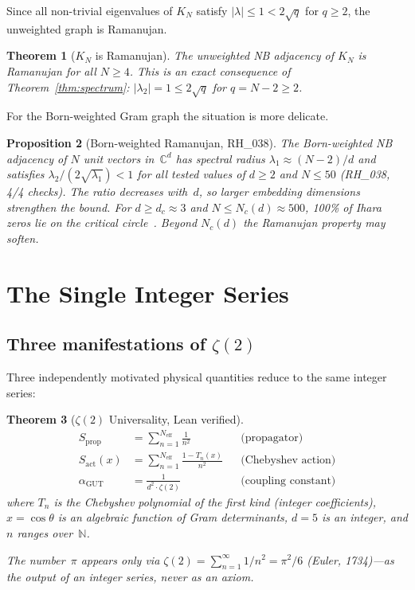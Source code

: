 \documentclass[12pt]{article}
\newtheorem{theorem}{Theorem}[section]
\newtheorem{proposition}[theorem]{Proposition}
\theoremstyle{definition}
\theoremstyle{remark}
\newcommand{\CC}{\mathbb{C}}
\newcommand{\NN}{\mathbb{N}}
\newcommand{\agut}{\alpha_{\mathrm{GUT}}}
\begin{document}
Since all non-trivial eigenvalues of $K_N$ satisfy
$|\lambda| \leq 1 < 2\sqrt{q}$ for $q \geq 2$,
the unweighted graph is Ramanujan.

\begin{theorem}[$K_N$ is Ramanujan]\label{thm:ram-kn}
The unweighted NB adjacency of $K_N$ is Ramanujan
for all $N \geq 4$.
This is an exact consequence of Theorem~\ref{thm:spectrum}:
$|\lambda_2| = 1 \leq 2\sqrt{q}$ for $q = N - 2 \geq 2$.
\end{theorem}

For the Born-weighted Gram graph the situation is more delicate.

\begin{proposition}[Born-weighted Ramanujan, RH\_038]\label{thm:ram-born}
The Born-weighted NB adjacency of $N$ unit vectors in~$\CC^d$
has spectral radius $\lambda_1 \approx (N-2)/d$ and satisfies
$\lambda_2 / (2\sqrt{\lambda_1}) < 1$ for all tested values
of $d \geq 2$ and $N \leq 50$ (RH\_038, 4/4 checks).
The ratio \emph{decreases} with~$d$, so larger embedding
dimensions strengthen the bound.
For $d \geq d_c \approx 3$ and $N \leq N_c(d) \approx 500$,
100\% of Ihara zeros lie on the critical circle~\cite{Paper5}.
Beyond $N_c(d)$ the Ramanujan property may soften.
\end{proposition}

\section{The Single Integer Series}
\label{sec:zeta2}

\subsection{Three manifestations of $\zeta(2)$}

Three independently motivated physical quantities reduce to the
same integer series:

\begin{theorem}[$\zeta(2)$ Universality, Lean verified]\label{thm:zeta2}
\begin{align}
  S_{\mathrm{prop}} &= \sum_{n=1}^{N_{\mathrm{eff}}} \frac{1}{n^2}
    &&\text{(propagator)} \label{eq:prop} \\
  S_{\mathrm{act}}(x) &= \sum_{n=1}^{N_{\mathrm{eff}}}
    \frac{1 - T_n(x)}{n^2}
    &&\text{(Chebyshev action)} \label{eq:act} \\
  \agut &= \frac{1}{d^2 \cdot \zeta(2)}
    &&\text{(coupling constant)} \label{eq:coupling}
\end{align}
where $T_n$ is the Chebyshev polynomial of the first kind
(integer coefficients), $x = \cos\theta$ is an algebraic
function of Gram determinants, $d = 5$ is an integer, and
$n$ ranges over~$\NN$.

The number~$\pi$ appears only via
$\zeta(2) = \sum_{n=1}^{\infty} 1/n^2 = \pi^2/6$
(Euler, 1734)---as the \emph{output} of an integer series,
never as an axiom.
\end{theorem}
\end{document}
